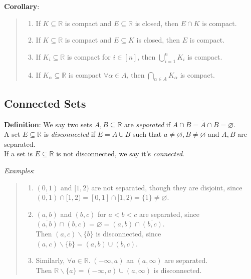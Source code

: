 \documentclass[11pt]{article}
\begin{document}
\textbf{Corollary}:
\begin{quote}\vspace{-0.3cm}
	\begin{enumerate}
	\item If $K \subseteq \mathbb{R}$ is compact and $E \subseteq \mathbb{R}$ is closed, then $E \cap K$ is compact.
	\item If $K \subseteq \mathbb{R}$ is compact and $E \subseteq K$ is closed, then $E$ is compact.
	\item If $K_i \subseteq \mathbb{R}$ is compact for $i \in [n]$, then $\bigcup_{i=1}^n K_i$ is compact.
	\item If $K_\alpha \subseteq \mathbb{R}$ is compact $\forall \alpha \in A$, then $\bigcap_{\alpha \in A} K_\alpha$ is compact.
	\end{enumerate}
\end{quote}

\subsection{Connected Sets}

\textbf{Definition}: We say two sets $A, B \subseteq \mathbb{R}$ are \emph{separated} if $A \cap \bar{B} = \bar{A} \cap B = \varnothing$.\\
A set $E \subseteq \mathbb{R}$ is \emph{disconnected} if $E = A \cup B$ such that $a \neq \varnothing, B \neq \varnothing$ and $A, B$ are separated.\\
If a set is $E \subseteq \mathbb{R}$ is not disconnected, we say it's \emph{connected}.

\emph{Examples}:
\begin{quote}\vspace{-0.3cm}
	\begin{enumerate}
	\item $(0, 1)$ and $[1,2)$ are not separated, though they are disjoint, since $\overline{(0,1)} \cap [1,2) = [0,1] \cap [1,2) = \{1\} \neq \varnothing$.
	\item $(a,b)$ and $(b,c)$ for $a < b < c$ are separated, since $\overline{(a,b)} \cap (b,c) = \varnothing = (a,b) \cap \overline{(b,c)}$.\\
	Then $(a,c) \backslash \{b\}$ is disconnected, since $(a,c) \backslash \{b\} = (a,b) \cup (b,c)$.
	\item Similarly, $\forall a \in \mathbb{R}.\; (-\infty, a)$ an $(a, \infty)$ are separated.\\
	Then $\mathbb{R} \backslash \{a\} = (-\infty, a) \cup (a, \infty)$ is disconnected.
	\end{enumerate}
\end{quote}
\end{document}
